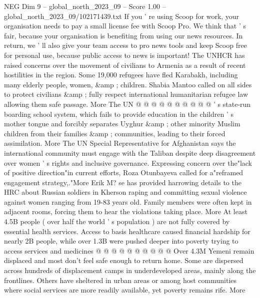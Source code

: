 \begin{textsample}{NEG Dim 9 – global\_north\_2023\_09 – Score 1.00 – global\_north\_2023\_09/102171439.txt}
If you ' re using Scoop for work, your organisation needs to pay a small license fee with Scoop Pro.
We think that ' s fair, because your organisation is benefiting from using our news resources.
In return, we ' ll also give your team access to pro news tools and keep Scoop free for personal use, because public access to news is important!
The UNHCR has raised concerns over the movement of civilians to Armenia as a result of recent hostilities in the region.
Some 19,000 refugees have fled Karabakh, including many elderly people, women, \&amp ; children.
Shabia Mantoo called on all sides to protect civilians \&amp ; fully respect international humanitarian refugee law allowing them safe passage.
More The UN @ @ @ @ @ @ @ @ @ @ ' s state-run boarding school system, which fails to provide education in the children ' s mother tongue and forcibly separates Uyghur \&amp ; other minority Muslim children from their families \&amp ; communities, leading to their forced assimilation.
More The UN Special Representative for Afghanistan says the international community must engage with the Taliban despite deep disagreement over women ' s rights and inclusive governance.
Expressing concern over the"lack of positive direction"in current efforts, Roza Otunbayeva called for a"reframed engagement strategy,."More Erik M? se has provided harrowing details to the HRC about Russian soldiers in Kherson raping and committing sexual violence against women ranging from 19-83 years old.
Family members were often kept in adjacent rooms, forcing them to hear the violations taking place.
More At least 4.5B people ( over half the world ' s population ) are not fully covered by essential health services.
Access to basis healthcare caused financial hardship for nearly 2B people, while over 1.3B were pushed deeper into poverty trying to access services and medicines @ @ @ @ @ @ @ @ @ @ Over 4.3M Yemeni remain displaced and most don't feel safe enough to return home.
Some are dispersed across hundreds of displacement camps in underdeveloped areas, mainly along the frontlines.
Others have sheltered in urban areas or among host communities where social services are more readily available, yet poverty remains rife.
More

\end{textsample}
